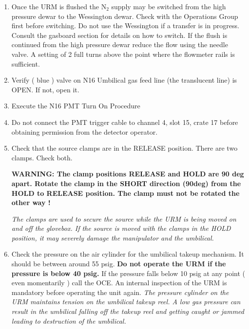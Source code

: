 \begin{enumerate}
\item Once the URM is flushed the N$_2$ supply may be switched from the high
pressure dewar to the Wessington dewar. Check with the Operations Group first
before switching. Do not use the Wessington if a transfer is in progress.
Consult the gasboard section for details on how to switch. If the flush is continued
from the high pressure dewar reduce the flow using the needle valve. A setting of
2 full turns above the point where the flowmeter rails is sufficient.



\item\checkbox Verify ( blue ) valve on N16 Umbilical gas feed line (the translucent
               line) is OPEN.  If not, open it.


\item\checkbox Execute the N16 PMT Turn On Procedure



\item\checkbox Do not connect the PMT trigger cable to channel 4, slot 15, crate 17
before obtaining permission from the detector operator.

\item \checkbox Check that the source clamps are in the RELEASE position.  
   There are two clamps.  Check both.\\
  {\bf
    WARNING:  The clamp positions RELEASE and HOLD are 90 deg apart.
      Rotate the clamp in the SHORT direction (90deg) from the HOLD
      to RELEASE position.       The clamp must {\bf not}  be rotated the 
other way !

  }
  \small
  {\em
   The clamps are used to secure the source while the URM is being moved
   on and off the glovebox.  If the source is moved with the clamps in
   the HOLD position, it may severely damage the manipulator and the umbilical.
  }
  \normalsize
 
\item \checkbox Check the pressure on the air cylinder for the umbilical
takeup mechanism. It should be between around 55 psig.
   {\bf Do not operate the URM if the pressure is below 40 psig. }
 If the pressure falls below 10 psig at any point ( even momentarily ) call the OCE. 
An internal inspection of the URM is mandatory before operating the unit again.
   \small
   {\em
     The pressure cylinder on the URM maintains tension on the umbilical
     takeup reel.  A low gas pressure can result in the umbilical falling
     off the takeup reel and getting caught or jammed leading to destruction
     of the umbilical.
   }
   \normalsize



\end{enumerate}
